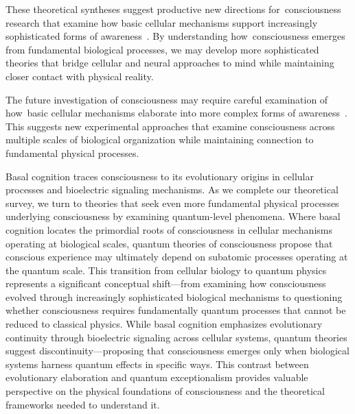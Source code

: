 These theoretical syntheses suggest productive new directions for~consciousness research that examine how basic cellular mechanisms support increasingly sophisticated forms of awareness~\cite{Baluska2016, lyon2021reframing}. By understanding how~consciousness emerges from fundamental biological processes, we may develop more sophisticated theories that bridge cellular and neural approaches to mind while maintaining closer contact with physical reality.

The future investigation of consciousness may require careful examination of how~basic cellular mechanisms elaborate into more complex forms of awareness~\cite{Lyon2015, levin2020revisiting}. This suggests new experimental approaches that examine consciousness across multiple scales of biological organization while maintaining connection to fundamental physical processes.

Basal cognition traces consciousness to its evolutionary origins in cellular processes and bioelectric signaling mechanisms. As we complete our theoretical survey, we turn to theories that seek even more fundamental physical processes underlying consciousness by examining quantum-level phenomena. Where basal cognition locates the primordial roots of consciousness in cellular mechanisms operating at biological scales, quantum theories of consciousness propose that conscious experience may ultimately depend on subatomic processes operating at the quantum scale. This transition from cellular biology to quantum physics represents a significant conceptual shift—from examining how consciousness evolved through increasingly sophisticated biological mechanisms to questioning whether consciousness requires fundamentally quantum processes that cannot be reduced to classical physics. While basal cognition emphasizes evolutionary continuity through bioelectric signaling across cellular systems, quantum theories suggest discontinuity—proposing that consciousness emerges only when biological systems harness quantum effects in specific ways. This contrast between evolutionary elaboration and quantum exceptionalism provides valuable perspective on the physical foundations of consciousness and the theoretical frameworks needed to understand it.
